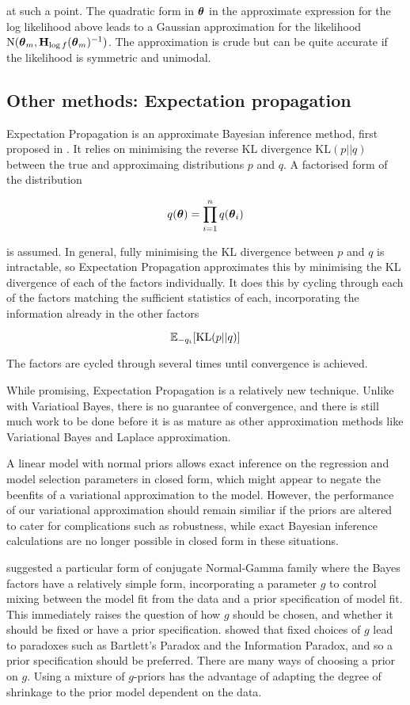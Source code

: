 \noindent at such a point. The quadratic form in ${\boldsymbol \theta}$ in the approximate
expression for the log likelihood above leads to a Gaussian approximation for
the likelihood $\text{N}({\boldsymbol \theta}_m, {\bf H}_{\log f}({\boldsymbol \theta}_m)^{-1})$. The approximation
is crude but can be quite accurate if the likelihood is symmetric and unimodal.

\subsection{Other methods: Expectation propagation}

Expectation Propagation is an approximate Bayesian inference method, first
proposed in \citep{Minka2001}.  It relies on minimising the reverse KL
divergence $\text{KL}(p || q)$ between the true and approximaing distributions
$p$ and $q$. A factorised form of the distribution

\[
	q({\boldsymbol \theta}) = \prod_{i=1}^n q({\boldsymbol \theta}_i)
\]

is assumed. In general, fully minimising the KL divergence between $p$ and $q$
is intractable, so Expectation Propagation approximates this by minimising the
KL divergence of each of the factors individually.  It does this by cycling
through each of the factors matching the sufficient statistics of each,
incorporating the information already in the other factors

\[
	{\mathbb E}_{-q_i} [\text{KL}(p || q)]
\]

The factors are cycled through several times until convergence is achieved.

While promising, Expectation Propagation is a relatively new technique.  Unlike
with Variatioal Bayes, there is no guarantee of convergence, and there is still
much work to be done before it is as mature as other approximation methods like
Variational Bayes and Laplace approximation.

A linear model with normal priors allows exact inference on the regression and
model selection parameters in closed form, which might appear to negate the
beenfits of a variational approximation to the model. However, the performance
of our variational approximation should remain similiar if the priors are
altered to cater for complications such as robustness, while exact Bayesian
inference calculations are no longer possible in closed form in these
situations.

\cite{Zellner1986} suggested a particular form of conjugate Normal-Gamma family
where the Bayes factors have a relatively simple form, incorporating a parameter
$g$ to control mixing between the model fit from the data and a prior
specification of model fit. This immediately raises the question of how $g$
should be chosen, and whether it should be fixed or have a prior specification.
\cite{Liang2008} showed that fixed choices of $g$ lead to paradoxes such as
Bartlett's Paradox and the Information Paradox, and so a prior specification
should be preferred. There are many ways of choosing a prior on $g$. Using a
mixture of $g$-priors has the advantage of adapting the degree of shrinkage to
the prior model dependent on the data.

